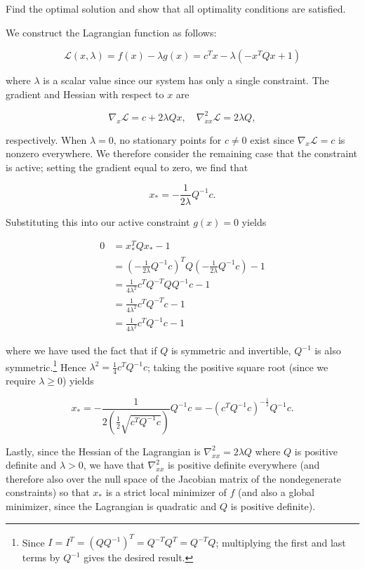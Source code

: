 Find the optimal solution and show that all optimality conditions are satisfied.

\begin{solution}
    We construct the Lagrangian function as follows:

    $$
    \mathcal{L}(x, \lambda) = f(x) - \lambda g(x) = c^T x - \lambda (-x^T Q x + 1)
    $$

    where $\lambda$ is a scalar value since our system has only a single constraint. The gradient and Hessian with 
    respect to $x$ are

    $$
    \nabla_x \mathcal{L} = c + 2 \lambda Q x, \quad \nabla^2_{xx} \mathcal{L} = 2 \lambda Q,
    $$

    respectively. When $\lambda = 0$, no stationary points for $c \neq 0$ exist since $\nabla_x \mathcal{L} = c$ is 
    nonzero everywhere. We therefore consider the remaining case that the constraint is active; setting the gradient 
    equal to zero, we find that 

    $$
    x_* = -\frac{1}{2 \lambda} Q^{-1} c.
    $$

    Substituting this into our active constraint $g(x) = 0$ yields

    \begin{align*}
        0 &= x_*^T Q x_* - 1\\
          &= \left(-\frac{1}{2 \lambda} Q^{-1} c \right)^T Q \left( -\frac{1}{2 \lambda} Q^{-1} c \right) - 1 \\
          &= \frac{1}{4 \lambda^2} c^T Q^{-T} Q Q^{-1} c - 1 \\
          &= \frac{1}{4 \lambda^2} c^T Q^{-T} c - 1 \\
          &= \frac{1}{4 \lambda^2} c^T Q^{-1} c - 1
    \end{align*}

    where we have used the fact that if $Q$ is symmetric and invertible, $Q^{-1}$ is also symmetric.\footnote{
        Since $I = I^T = \left(Q Q^{-1} \right)^T = Q^{-T} Q^T = Q^{-T} Q$; multiplying the first and last terms by 
        $Q^{-1}$ gives the desired result.
    } Hence $\lambda^2 = \frac{1}{4} c^T Q^{-1} c$; taking the positive square root (since we require $\lambda \ge 0$) 
    yields

    $$
    x_* = -\frac{1}{2 \left(\frac{1}{2} \sqrt{c^T Q^{-1} c} \right)} Q^{-1} c = -\left( c^T Q^{-1} c \right)^{-\frac{1}{2}} Q^{-1} c.
    $$

    Lastly, since the Hessian of the Lagrangian is $\nabla^2_{xx} = 2 \lambda Q$ where $Q$ is positive definite and 
    $\lambda > 0$, we have that $\nabla^2_{xx}$ is positive definite everywhere (and therefore also over the null space 
    of the Jacobian matrix of the nondegenerate constraints) so that $x_*$ is a strict local minimizer of $f$ (and also 
    a global minimizer, since the Lagrangian is quadratic and $Q$ is positive definite).
    \ \\
\end{solution}